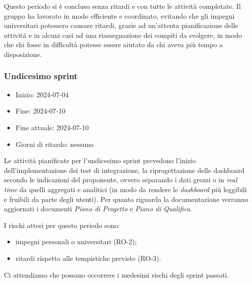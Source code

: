 Questo periodo si è concluso senza ritardi e con tutte le attività completate. Il gruppo ha lavorato in modo efficiente e coordinato, evitando che gli impegni universitari potessero causare ritardi, grazie ad un'attenta pianificazione delle attività e in alcuni casi ad una riassegnazione dei compiti da svolgere, in modo che chi fosse in difficoltà potesse essere aiutato da chi aveva più tempo a disposizione.



\newpage
\subsubsection{Undicesimo sprint}
\begin{itemize}
    \item Inizio: 2024-07-04
    \item Fine: 2024-07-10
    \item Fine attuale: 2024-07-10
    \item Giorni di ritardo: nessuno
\end{itemize}

Le attività pianificate per l'undicesimo sprint prevedono l'inizio dell'implementazione dei test di integrazione, la riprogettazione delle dashboard secondo le indicazioni del proponente, ovvero separando i dati grezzi o in \textit{real time} da quelli aggregati e analitici (in modo da rendere le \textit{dashboard} più leggibili e fruibili da parte degli utenti). Per quanto riguarda la documentazione verranno aggiornati i documenti \textit{Piano di Progetto} e \textit{Piano di Qualifica}.

I rischi attesi per questo periodo sono:
\begin{itemize}
    \item impegni personali o universitari (RO-2);
	\item ritardi rispetto alle tempistiche previste (RO-3).
\end{itemize}
Ci attendiamo che possano occorrere i medesimi rischi degli sprint passati.

